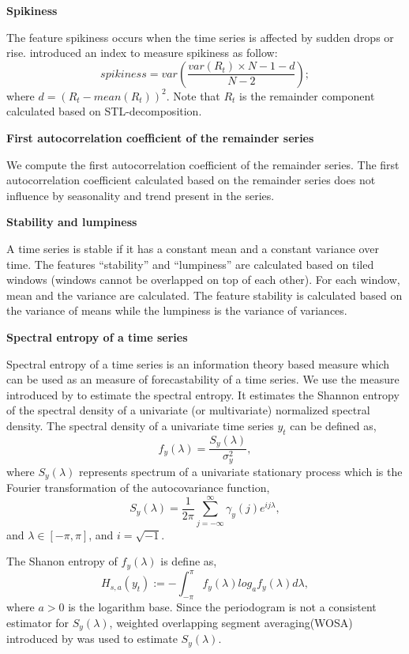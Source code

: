 \documentclass[11pt,a4paper,]{article}
\theoremstyle{definition}
\theoremstyle{definition}
\theoremstyle{definition}
\theoremstyle{remark}
\begin{document}
\textbf{Spikiness}

The feature spikiness occurs when the time series is affected by sudden
drops or rise. \textcite{hyndman2015large} introduced an index to
measure spikiness as follow:
\[spikiness=var\left(\frac{var(R_t)\times N-1-d}{N-2}\right);\] where
\(d=(R_t-mean(R_t))^2\). Note that \(R_t\) is the remainder component
calculated based on STL-decomposition.

\textbf{First autocorrelation coefficient of the remainder series}

We compute the first autocorrelation coefficient of the remainder
series. The first autocorrelation coefficient calculated based on the
remainder series does not influence by seasonality and trend present in
the series.

\textbf{Stability and lumpiness}

A time series is stable if it has a constant mean and a constant
variance over time. The features ``stability'' and ``lumpiness'' are
calculated based on tiled windows (windows cannot be overlapped on top
of each other). For each window, mean and the variance are calculated.
The feature stability is calculated based on the variance of means while
the lumpiness is the variance of variances.

\textbf{Spectral entropy of a time series}

Spectral entropy of a time series is an information theory based measure
which can be used as an measure of forecastability of a time series. We
use the measure introduced by \textcite{goerg2013forecastable} to
estimate the spectral entropy. It estimates the Shannon entropy of the
spectral density of a univariate (or multivariate) normalized spectral
density. The spectral density of a univariate time series \(y_t\) can be
defined as, \[f_y(\lambda)=\frac{S_y(\lambda)}{\sigma^2_y},\] where
\(S_y(\lambda)\) represents spectrum of a univariate stationary process
which is the Fourier transformation of the autocovariance function,
\[S_y(\lambda)=\frac{1}{2\pi}\sum_{j=-\infty}^{\infty}\gamma_{y}(j)e^{ij\lambda},\]
and \(\lambda \in [-\pi, \pi]\), and \(i=\sqrt{-1}\).

The Shanon entropy of \(f_y(\lambda)\) is define as,
\[ H_{s,a}(y_t):=-\int_{-\pi}^{\pi}f_y(\lambda)log_af_y({\lambda})d\lambda,\]
where \(a>0\) is the logarithm base. Since the periodogram is not a
consistent estimator for \(S_y(\lambda)\), weighted overlapping segment
averaging(WOSA) introduced by \textcite{nuttall1982spectral} was used to
estimate \(S_y(\lambda)\).
\end{document}
